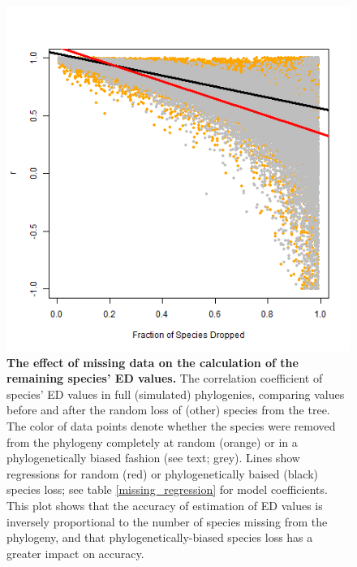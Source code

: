 \documentclass[10pt,english]{article}
\begin{document}
\begin{figure}[!ht]
  \center
  \includegraphics[width=.5\textwidth]{randomVsCluster.png}
  \caption{\textbf{The effect of missing data on the calculation of
      the remaining species' ED values.} The correlation coefficient
    of species' ED values in full (simulated) phylogenies, comparing
    values before and after the random loss of (other) species from
    the tree. The color of data points denote whether the species were
    removed from the phylogeny completely at random (orange) or in a
    phylogenetically biased fashion (see text; grey). Lines show
    regressions for random (red) or phylogenetically baised (black)
    species loss; see table \ref{missing_regression} for model
    coefficients. This plot shows that the accuracy of estimation of
    ED values is inversely proportional to the number of species
    missing from the phylogeny, and that phylogenetically-biased
    species loss has a greater impact on accuracy.}
  \label{randomVsClustered}
\end{figure}
\end{document}
